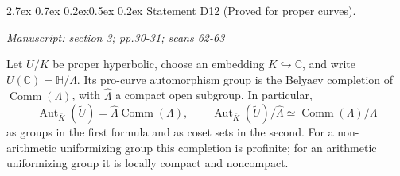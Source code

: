 \documentclass[11pt,a4paper]{article}
\makeatletter
\newcommand{\passage}[1]{\par\smallskip\noindent\textit{Manuscript: #1}\par\smallskip}
\renewcommand\paragraph{\@startsection{paragraph}{4}{\z@}%
  {2.7ex \@plus 0.7ex \@minus 0.2ex}{0.5ex \@plus 0.2ex}%
  {\normalfont\normalsize\bfseries}}
\makeatother
\begin{document}
\paragraph{Statement D12 (Proved for proper curves).}\label{res:D12}
\passage{section 3; pp.30-31; scans 62-63}

Let $U/\overline K$ be proper hyperbolic, choose an embedding
$\overline K\hookrightarrow\mathbb C$, and write
$U(\mathbb C)=\mathbb H/\Lambda$.  Its pro-curve automorphism group is
the Belyaev completion of $\operatorname{Comm}(\Lambda)$, with
$\widehat\Lambda$ a compact open subgroup.  In particular,
\[
 \operatorname{Aut}_{\overline K}(\widetilde U)
       =\widehat\Lambda\operatorname{Comm}(\Lambda),\qquad
 \operatorname{Aut}_{\overline K}(\widetilde U)/\widehat\Lambda
       \simeq\operatorname{Comm}(\Lambda)/\Lambda
\]
as groups in the first formula and as coset sets in the second.
For a non-arithmetic uniformizing group this completion is profinite;
for an arithmetic uniformizing group it is locally compact and
noncompact.
\end{document}
